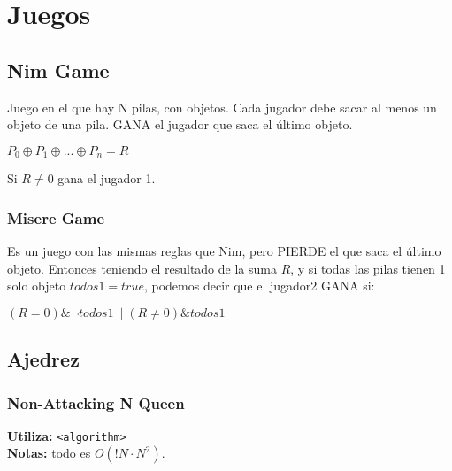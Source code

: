 \section{Juegos}
\subsection{Nim Game}
\begin{flushleft}
Juego en el que hay N pilas, con objetos. Cada jugador debe sacar al menos un objeto de una pila. GANA el jugador que saca el \'ultimo objeto.
\end{flushleft}
$P_0{\oplus}P_1{\oplus}...{\oplus}P_n = R$
\begin{flushleft}
Si $R{\neq}0$ gana el jugador 1.
\end{flushleft}

\subsubsection{Misere Game}
\begin{flushleft}
Es un juego con las mismas reglas que Nim, pero PIERDE el que saca el \'ultimo objeto. Entonces teniendo el resultado de la suma $R$, y 
si todas las pilas tienen 1 solo objeto $todos1{=}true$, podemos decir que el jugador2 GANA si:
\end{flushleft}
${(R{=}0){\&}{\neg}{todos1}{\parallel}(R{\neq}0 ){\&}{todos1}}$
\subsection{Ajedrez}
\subsubsection{Non-Attacking N Queen}
\begin{footnotesize}
	\textbf{Utiliza:} \texttt{<algorithm>}\\
	\textbf{Notas:} todo es $ O(!N \cdot N^{2})$.
\end{footnotesize}

